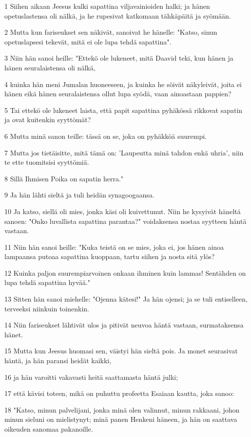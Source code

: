 \par 1 Siihen aikaan Jeesus kulki sapattina viljavainioiden halki; ja hänen opetuslastensa oli nälkä, ja he rupesivat katkomaan tähkäpäitä ja syömään.
\par 2 Mutta kun fariseukset sen näkivät, sanoivat he hänelle: "Katso, sinun opetuslapsesi tekevät, mitä ei ole lupa tehdä sapattina".
\par 3 Niin hän sanoi heille: "Ettekö ole lukeneet, mitä Daavid teki, kun hänen ja hänen seuralaistensa oli nälkä,
\par 4 kuinka hän meni Jumalan huoneeseen, ja kuinka he söivät näkyleivät, joita ei hänen eikä hänen seuralaistensa ollut lupa syödä, vaan ainoastaan pappien?
\par 5 Tai ettekö ole lukeneet laista, että papit sapattina pyhäkössä rikkovat sapatin ja ovat kuitenkin syyttömät?
\par 6 Mutta minä sanon teille: tässä on se, joka on pyhäkköä suurempi.
\par 7 Mutta jos tietäisitte, mitä tämä on: 'Laupeutta minä tahdon enkä uhria', niin te ette tuomitsisi syyttömiä.
\par 8 Sillä Ihmisen Poika on sapatin herra."
\par 9 Ja hän lähti sieltä ja tuli heidän synagoogaansa.
\par 10 Ja katso, siellä oli mies, jonka käsi oli kuivettunut. Niin he kysyivät häneltä sanoen: "Onko luvallista sapattina parantaa?" voidaksensa nostaa syytteen häntä vastaan.
\par 11 Niin hän sanoi heille: "Kuka teistä on se mies, joka ei, jos hänen ainoa lampaansa putoaa sapattina kuoppaan, tartu siihen ja nosta sitä ylös?
\par 12 Kuinka paljon suurempiarvoinen onkaan ihminen kuin lammas! Sentähden on lupa tehdä sapattina hyvää."
\par 13 Sitten hän sanoi miehelle: "Ojenna kätesi!" Ja hän ojensi; ja se tuli entiselleen, terveeksi niinkuin toinenkin.
\par 14 Niin fariseukset lähtivät ulos ja pitivät neuvoa häntä vastaan, surmataksensa hänet.
\par 15 Mutta kun Jeesus huomasi sen, väistyi hän sieltä pois. Ja monet seurasivat häntä, ja hän paransi heidät kaikki,
\par 16 ja hän varoitti vakavasti heitä saattamasta häntä julki;
\par 17 että kävisi toteen, mikä on puhuttu profeetta Esaiaan kautta, joka sanoo:
\par 18 "Katso, minun palvelijani, jonka minä olen valinnut, minun rakkaani, johon minun sieluni on mielistynyt; minä panen Henkeni häneen, ja hän on saattava oikeuden sanomaa pakanoille.
